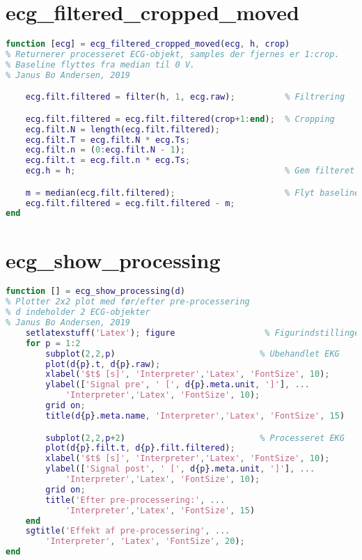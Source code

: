 \documentclass[a4paper]{report}
\begin{document}
\section{ecg\_filtered\_cropped\_moved}

        
\begin{lstlisting}[language=Matlab, style=Matlab-editor]
function [ecg] = ecg_filtered_cropped_moved(ecg, h, crop)
% Returnerer processeret ECG-objekt, samples der fjernes er 1:crop.
% Baseline flyttes fra median til 0 V.
% Janus Bo Andersen, 2019

    ecg.filt.filtered = filter(h, 1, ecg.raw);          % Filtrering

    ecg.filt.filtered = ecg.filt.filtered(crop+1:end);  % Cropping
    ecg.filt.N = length(ecg.filt.filtered);
    ecg.filt.T = ecg.filt.N * ecg.Ts;
    ecg.filt.n = (0:ecg.filt.N - 1);
    ecg.filt.t = ecg.filt.n * ecg.Ts;
    ecg.h = h;                                          % Gem filteret

    m = median(ecg.filt.filtered);                      % Flyt baseline
    ecg.filt.filtered = ecg.filt.filtered - m;
end
\end{lstlisting}



\section{ecg\_show\_processing}

        
\begin{lstlisting}[language=Matlab, style=Matlab-editor]
function [] = ecg_show_processing(d)
% Plotter 2x2 plot med før/efter pre-processering
% d indeholder 2 ECG-objekter
% Janus Bo Andersen, 2019
    setlatexstuff('Latex'); figure                  % Figurindstillinger
    for p = 1:2
        subplot(2,2,p)                             % Ubehandlet EKG
        plot(d{p}.t, d{p}.raw);
        xlabel('$t$ [s]', 'Interpreter','Latex', 'FontSize', 10);
        ylabel(['Signal pre', ' [', d{p}.meta.unit, ']'], ...
            'Interpreter','Latex', 'FontSize', 10);
        grid on;
        title(d{p}.meta.name, 'Interpreter','Latex', 'FontSize', 15)

        subplot(2,2,p+2)                           % Processeret EKG
        plot(d{p}.filt.t, d{p}.filt.filtered);
        xlabel('$t$ [s]', 'Interpreter','Latex', 'FontSize', 10);
        ylabel(['Signal post', ' [', d{p}.meta.unit, ']'], ...
            'Interpreter','Latex', 'FontSize', 10);
        grid on;
        title('Efter pre-processering:', ...
            'Interpreter','Latex', 'FontSize', 15)
    end
    sgtitle('Effekt af pre-processering', ...
        'Interpreter', 'Latex', 'FontSize', 20);
end
\end{lstlisting}
\end{document}
